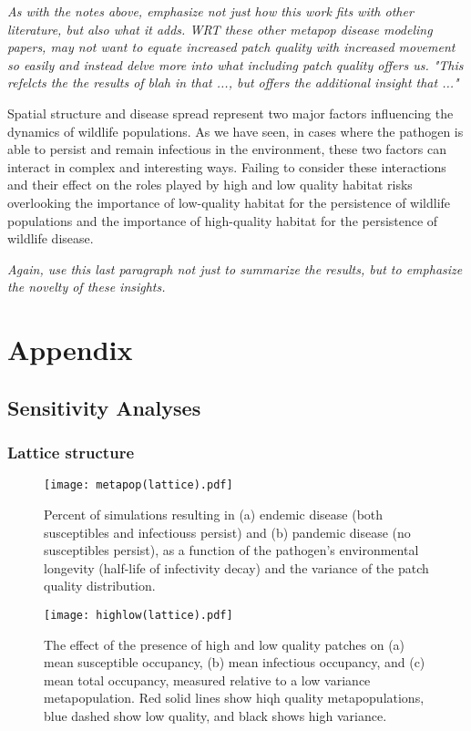\documentclass{svjour3}
\begin{document}
\emph{As with the notes above, emphasize not just how this work fits with other literature, but also what it adds.  WRT these other metapop disease modeling papers, may not want to equate increased patch quality with increased movement so easily and instead delve more into what including patch quality offers us.  "This refelcts the the results of blah in that ..., but offers the additional insight that ..."}

Spatial structure and disease spread represent two major factors influencing the dynamics of wildlife populations.  As we have seen, in cases where the pathogen is able to persist and remain infectious in the environment, these two factors can interact in complex and interesting ways.  Failing to consider these interactions and their effect on the roles played by high and low quality habitat risks overlooking the importance of low-quality habitat for the persistence of wildlife populations and the importance of high-quality habitat for the persistence of wildlife disease.

\emph{Again, use this last paragraph not just to summarize the results, but to emphasize the novelty of these insights.}

\clearpage

\section{Appendix}

\subsection{Sensitivity Analyses}

\subsubsection{Lattice structure}

\begin{figure}[h!]
\centering
\texttt{[image: metapop(lattice).pdf]}
\caption{Percent of simulations resulting in (a) endemic disease (both susceptibles and infectiouss persist) and (b) pandemic disease (no susceptibles persist), as a function of the pathogen's environmental longevity (half-life of infectivity decay) and the variance of the patch quality distribution.}
\label{poutcome_lattice}
\end{figure}   

\begin{figure}
\centering
\texttt{[image: highlow(lattice).pdf]}
\caption{The effect of the presence of high and low quality patches on (a) mean susceptible occupancy, (b) mean infectious occupancy, and (c) mean total occupancy, measured relative to  a low variance metapopulation.  Red solid lines show hiqh quality metapopulations, blue dashed show low quality, and black shows high variance.}
\label{sens_lattice}
\end{figure}
\end{document}
